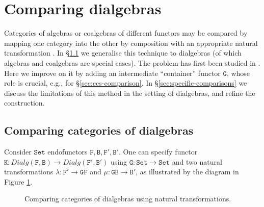 \documentclass[orivec]{llncs}
\newcommand{\obj}[3]{\node (#1) [#2] {$#3$};}
\newcommand{\arr}[3]{\path[->,font=\scriptsize](#2) edge node[auto] {$#1$} (#3);}
\newcommand{\mC}[1]{\mathtt{#1}}
\newcommand{\mF}[1]{\mathtt{#1}}
\newcommand{\Set}{\mC{Set}}
\newcommand{\F}{\mF{F}}
\newcommand{\G}{\mF{G}}
\newcommand{\B}{\mF{B}}
\newcommand{\K}{\mF{K}}
\newcommand{\dialg}{\mathit{Dialg}}
\begin{document}
\section{Comparing dialgebras}\label{sec:comparing-all}



Categories of algebras or coalgebras of different functors may be compared by mapping one category into the other by composition with an appropriate natural transformation \cite{Rut00}. In \S \ref{sec:comparing-categories} we generalise this technique to dialgebras (of which algebras and coalgebras are special cases). The problem has first been studied in \cite{Vou10}. Here we improve on it by adding an intermediate ``container'' functor $\G$, whose role is crucial, e.g., for \S \ref{sec:ccs-comparison}. In \S \ref{sec:specific-comparisons} we discuss the limitations of this method in the setting of dialgebras, and refine the construction.

\subsection{Comparing categories of dialgebras}
\label{sec:comparing-categories}


Consider $\Set$ endofunctors $\F,\B,\F',\B'$. One can specify functor $\K : \dialg(\F,\B) \to \dialg(\F',\B')$ using $\G : \Set \to \Set$ and two natural transformations $\lambda : \F' \to \G \F$ and $\mu : \G \B \to \B'$, as illustrated by the diagram in Figure \ref{fig:natural-in-set}.
\begin{figure}
\begin{center}
\end{center}
\caption{Comparing categories of dialgebras using natural transformations.}\label{fig:natural-in-set}
\end{figure}
\end{document}
